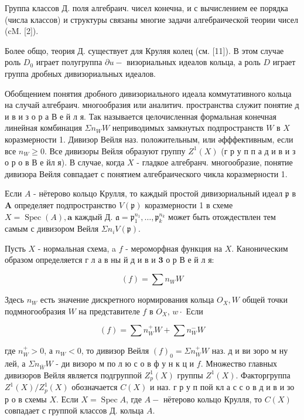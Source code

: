 \documentclass[10pt]{article}
\begin{document}
Группа классов Д. поля алгебраич. чисел конечна, и с вычислением ее порядка (числа классов) и структуры связаны многие задачи алгебраической теории чисел (cM. [2]).



Более общо, теория Д. существует для Круляя колец (см. [11]). В этом случае роль $D_{0}$ играет полугруппа $\partial u-$ визориальных идеалов кольца, а роль $D$ играет группа дробных дивизориальных идеалов.



Обобщением понятия дробного дивизориального идеала коммутативного кольца на случай алгебраич. многообразия или аналитич. пространства служит понятие д и в и з о р а В е й л я. Так называется целочисленная формальная конечная линейная комбинация $\Sigma n_{W} W$ неприводимых замкнутых подпространств $W$ в $X$ коразмерности 1. Дивизор Вейля наз. положительным, или әфффективным, если все $n_{W} \geqslant 0$. Все дивизоры Вейля образуют группу $Z^{1}(X)$ (г р у п п а д и в и з о р о в В е йл я). В случае, когда $X$ - гладкое алгебранч. многообразие, понятие дивизора Вейля совпадает с понятием алгебраического чикла коразмерности 1.



Если $A$ - нётерово кольцо Крулля, то каждый простой дивизориальный идеал $\mathfrak{p}$ в $\boldsymbol{A}$ определяет подпространство $V(\mathfrak{p})$ коразмерности 1 в схеме $X=\operatorname{Spec}(A), \mathbf{a}$ каждый Д. $\mathfrak{a}=\mathfrak{p}_{1}^{n_{1}}, \ldots, \mathfrak{p}_{k}^{n_{k}}$ может быть отождествлен тем самым с дивизором Вейля $\Sigma n_{i} V(\mathfrak{p})$.



Пусть $X$ - нормальная схема, a $f$ - мероморфная функция на $X$. Каноническим образом определяется г л а в ны й д и в и $\mathbf{3}$ о р В е й л я:



\[

(f)=\sum n_{W} W

\]



Здесь $n_{W}$ есть значение дискретного нормирования кольца $O_{X}, W$ общей точки подмногообразия $W$ на представителе $f$ в $O_{X}$, $w \cdot$ Если



\[

(f)=\sum n_{W}^{+} W+\sum n_{W}^{-} W

\]



где $n_{W}^{+}>0$, а $n_{W}<0$, то дивизор Вейля $(f)_{0}=\Sigma n_{W}^{+} W$ наз. д и ви зоро м ну лей, а $\Sigma n_{\bar{W}} W$ - ди визоро м по л ю с о в ф у н к ц и $f$. Множество главных дивизоров Вейля является подгруппой $Z_{p}^{1}(X)$ группы $Z^{1}(X)$. Факторгруппа $Z^{1}(X) / Z_{p}^{1}(X)$ обозначается $C(X)$ и наз. г р у п пой кл а с с о в д и в и зо р о в схемы $X$. Если $X=\operatorname{Spec} A$, где $A-$ нётерово кольцо Крулля, то $C(X)$ совпадает с группой классов Д. кольца $A$.
\end{document}
